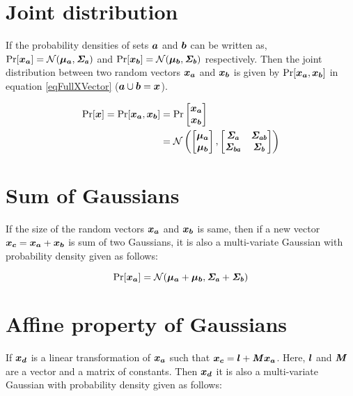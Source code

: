 \section{Joint distribution}
If the probability densities of sets $\boldsymbol{a}$ and $\boldsymbol{b}$ can be written as, $\Pr[\boldsymbol{x_a}] = \mathcal{N}(\boldsymbol{\mu_a}, \bm{\mathit{\Sigma_a}})$ and $\Pr[\boldsymbol{x_b}] = \mathcal{N}(\boldsymbol{\mu_b}, \bm{\mathit{\Sigma_b}})$ respectively. Then the joint distribution between two random vectors $\boldsymbol{x_a}$ and $\boldsymbol{x_b}$ is given by $\Pr[\boldsymbol{x_a}, \boldsymbol{x_b}]$ in equation \ref{eqFullXVector} ($\boldsymbol{a} \cup \boldsymbol{b} = \boldsymbol{x}$).

\begin{align}\label{eqFullXVector}
    \Pr  [ \boldsymbol{x}  ]  = \Pr  [ \boldsymbol{x_a}, \boldsymbol{x_b}]& = \Pr \begin{bmatrix}
\boldsymbol{x_a}\\ 
\boldsymbol{x_b}
\end{bmatrix} \\ 
& = \mathcal{N} \left ( \begin{bmatrix}
\boldsymbol{\mu_a}\\ 
\boldsymbol{\mu_b}
\end{bmatrix}, \begin{bmatrix}
\bm{\mathit{\Sigma_a}} & \bm{\mathit{\Sigma_{ab}}}\\ 
\bm{\mathit{\Sigma_{ba}}} & \bm{\mathit{\Sigma_b}}
\end{bmatrix} \right )
\end{align}

\section{Sum of Gaussians}
If the size of the random vectors $\boldsymbol{x_a}$ and $\boldsymbol{x_b}$ is same, then if a new vector $\boldsymbol{x_c} = \boldsymbol{x_a} + \boldsymbol{x_b}$ is sum of two Gaussians, it is also a multi-variate Gaussian with probability density given as follows:

\begin{equation}
    \Pr[\boldsymbol{x_a}] = \mathcal{N}(\boldsymbol{\mu_a} + \boldsymbol{\mu_b}, \bm{\mathit{\Sigma_a}} + \bm{\mathit{\Sigma_b}})
\end{equation}

\section{Affine property of Gaussians}
If $\boldsymbol{x_d}$ is a linear transformation of $\boldsymbol{x_a}$ such that $\boldsymbol{x_c} = \boldsymbol{l} + \bm{\mathit{M}}\boldsymbol{x_a}$. Here, $\boldsymbol{l}$ and $\bm{\mathit{M}}$ are a vector and a matrix of constants. Then $\boldsymbol{x_d}$ it is also a multi-variate Gaussian with probability density given as follows:

